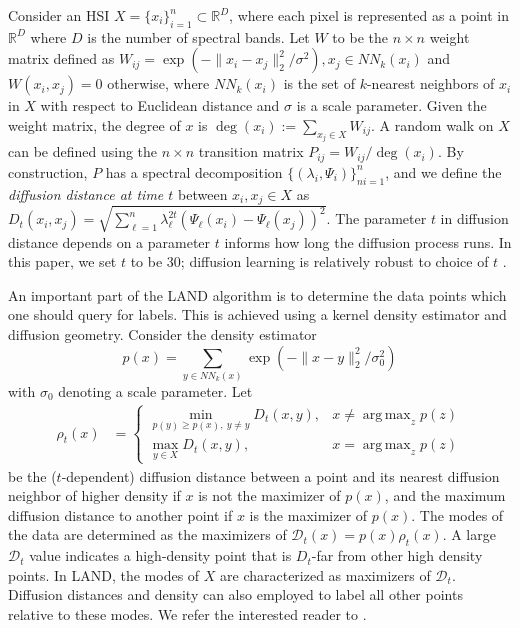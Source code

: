 \documentclass{article}
\def\R{{\mathbb R}}
\newcommand{\Dt}{\mathcal{D}_{t}}
\DeclareMathOperator*{\argmax}{arg\,max}
\begin{document}
Consider an HSI $X=\{x_{i}\}_{i=1}^{n}\subset\mathbb{R}^{D}$, where each pixel is represented as a point in $\R^{D}$ where $D$ is the number of spectral bands. Let $W$ to be the $n\times n$ weight matrix defined as $W_{ij}=\exp(-\|x_{i}-x_{j}\|_{2}^{2}/\sigma^{2}), x_{j}\in NN_{k}(x_{i})$ and $W(x_{i},x_{j})=0$ otherwise, where $NN_{k}(x_{i})$ is the set of $k$-nearest neighbors of $x_{i}$ in $X$ with respect to Euclidean distance and $\sigma$ is a scale parameter. Given the weight matrix, the degree of $x$ is $\deg(x_{i}):=\sum_{x_{j}\in X}W_{ij}$. A random walk on $X$ can be defined using the $n\times n$ transition matrix $P_{ij}={W_{ij}}\big/{\deg(x_{i})}.$  
By construction, $P$ has a spectral decomposition $\{(\lambda_{i},\Psi_{i})\}_{ni=1}^{n}$, and we define the \emph{diffusion distance at time $t$} between $x_{i},x_{j}\in X$ as $D_{t}(x_{i},x_{j})=\sqrt{\sum\nolimits_{\ell=1}^{n}\lambda_{\ell}^{2t}(\Psi_{\ell}(x_{i})-\Psi_{\ell}(x_{j}))^{2}}$.  The parameter $t$ in diffusion distance depends on a parameter $t$ informs how long the diffusion process runs.  In this paper, we set $t$ to be 30; diffusion learning is relatively robust to choice of $t$ \cite{Murphy2019_Unsupervised}. 

An important part of the LAND algorithm is to determine the data points which one should query for labels. This is achieved using a kernel density estimator and diffusion geometry.  Consider the density estimator 
\[
p(x)=\sum_{y\in NN_{k}(x)}\exp(-\|x-y\|_{2}^{2}/\sigma_{0}^{2})
\]
with $\sigma_0$ denoting a scale parameter. Let 
\begin{align}\label{eqn:rho}
\rho_{t}(x) &=
\begin{cases}
\displaystyle\min_{p(y)\ge p(x), \ y\neq y} D_{t}(x,y), &x\neq \argmax_{z}p(z) \\
\displaystyle\max_{y\in X} D_{t}(x,y), & x=\argmax_{z}p(z)
\end{cases}
\end{align} be the ($t$-dependent) diffusion distance between a point and its nearest diffusion neighbor of higher density if $x$ is not the maximizer of $p(x)$, and the maximum diffusion distance to another point if $x$ is the maximizer of $p(x)$.  The modes of the data are determined as the maximizers of $\Dt(x)=p(x)\rho_{t}(x)$.  A large $\Dt$ value indicates a high-density point that is $D_{t}$-far from other high density points. In LAND, the modes of $X$ are characterized as maximizers of $\Dt$. Diffusion distances and density can also employed to label all other points relative to these modes. We refer the interested reader to 
\cite{Maggioni2019_LAND}. 
\end{document}

